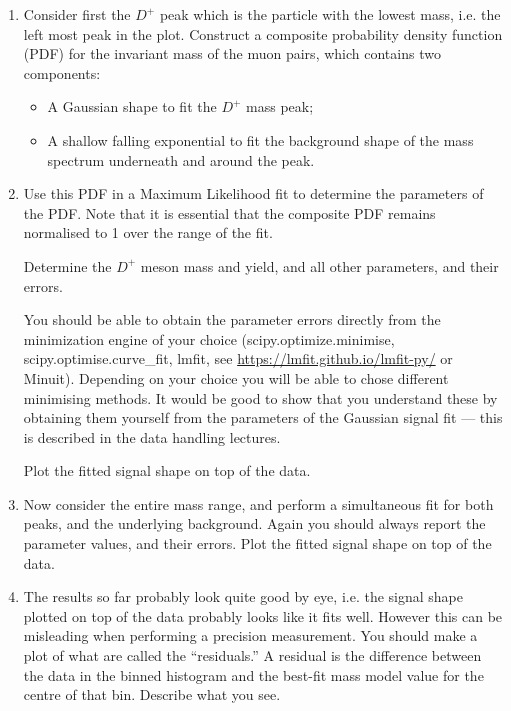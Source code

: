 \newpage
\begin{enumerate}

\item Consider first the $D^+$ peak which is the particle with the lowest mass, i.e. the left most peak in the plot.
Construct a composite probability density function (PDF) for the invariant mass of the muon pairs, which contains two components:
\begin{itemize}
\item A Gaussian shape to fit the $D^+$ mass peak;
\item A shallow falling exponential to fit the background shape of the mass spectrum underneath and around the peak.
\end{itemize}

\item	Use this PDF in a Maximum Likelihood fit to determine the parameters of the PDF.
Note that it is essential that the composite PDF remains normalised to 1 over the range of the fit.

Determine the $D^+$ meson mass and yield, and all other parameters, and their errors.

You should be able to obtain the parameter errors directly from the minimization engine of your choice (scipy.optimize.minimise, scipy.optimise.curve\_fit, lmfit, see \url{https://lmfit.github.io/lmfit-py/} or Minuit).
Depending on your choice you will be able to chose different minimising methods.
It would be good to show that you understand these by obtaining them yourself from the parameters of the Gaussian signal fit --- this is described in the data handling lectures.

Plot the fitted signal shape on top of the data.

\item Now consider the entire mass range, and perform a simultaneous fit for both peaks, and the underlying background.
Again you should always report the parameter values, and their errors.
Plot the fitted signal shape on top of the data.
\item The results so far probably look quite good by eye, i.e. the signal shape plotted on top of the data probably looks like it fits well.
However this can be misleading when performing a precision measurement.
You should make a plot of what are called the ``residuals.''
A residual is the difference between the data in the binned histogram and the best-fit mass model value for the centre of that bin.
Describe what you see.


\end{enumerate}
